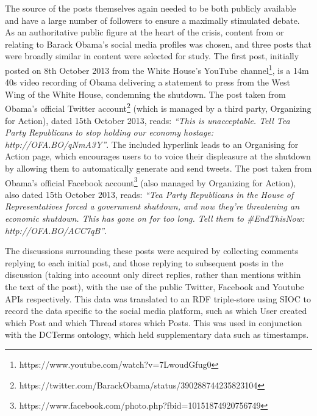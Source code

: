 The source of the posts themselves again needed to be both publicly available and have a large number of followers to ensure a maximally stimulated debate. As an authoritative public figure at the heart of the crisis, content from or relating to Barack Obama's social media profiles was chosen, and three posts that were broadly similar in content were selected for study. The first post, initially posted on 8th October 2013 from the White House's YouTube channel\footnote{https://www.youtube.com/watch?v=7LwoudGfug0}, is a 14m 40s video recording of Obama delivering a statement to press from the West Wing of the White House, condemning the shutdown. The post taken from Obama's official Twitter account\footnote{https://twitter.com/BarackObama/status/390288744235823104} (which is managed by a third party, Organizing for Action), dated 15th October 2013, reads: \textit{``This is unacceptable. Tell Tea Party Republicans to stop holding our economy hostage: http://OFA.BO/qNmA3Y''}. The included hyperlink leads to an Organising for Action page, which encourages users to to voice their displeasure at the shutdown by allowing them to automatically generate and send tweets. The post taken from Obama's official Facebook account\footnote{https://www.facebook.com/photo.php?fbid=10151874920756749} (also managed by Organizing for Action), also dated 15th October 2013, reads: \textit{``Tea Party Republicans in the House of Representatives forced a government shutdown, and now they're threatening an economic shutdown. This has gone on for too long. Tell them to \#EndThisNow: http://OFA.BO/ACC7qB''}.

The discussions surrounding these posts were acquired by collecting comments replying to each initial post, and those replying to subsequent posts in the discussion (taking into account only direct replies, rather than mentions within the text of the post), with the use of the public Twitter, Facebook and Youtube APIs respectively. This data was translated to an RDF triple-store using SIOC to record the data specific to the social media platform, such as which User created which Post and which Thread stores which Posts. This was used in conjunction with the DCTerms ontology, which held supplementary data such as timestamps.


